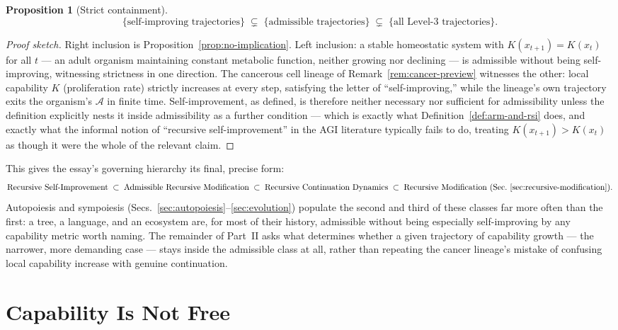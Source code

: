 \documentclass[12pt,a4paper]{article}
\theoremstyle{plain}
\newtheorem{proposition}[theorem]{Proposition}
\theoremstyle{definition}
\theoremstyle{remark}
\newcommand{\Adm}{\mathcal{A}}
\begin{document}
\begin{proposition}[Strict containment]
\label{prop:strict-containment}
\[
\{\text{self-improving trajectories}\} \;\subsetneq\; \{\text{admissible trajectories}\} \;\subsetneq\; \{\text{all Level-3 trajectories}\}.
\]
\end{proposition}

\begin{proof}[Proof sketch]
Right inclusion is Proposition~\ref{prop:no-implication}. Left inclusion: a stable homeostatic system with $K(x_{t+1})=K(x_t)$ for all $t$ — an adult organism maintaining constant metabolic function, neither growing nor declining — is admissible without being self-improving, witnessing strictness in one direction. The cancerous cell lineage of Remark~\ref{rem:cancer-preview} witnesses the other: local capability $K$ (proliferation rate) strictly increases at every step, satisfying the letter of ``self-improving,'' while the lineage's own trajectory exits the organism's $\Adm$ in finite time. Self-improvement, as defined, is therefore neither necessary nor sufficient for admissibility unless the definition explicitly nests it inside admissibility as a further condition — which is exactly what Definition~\ref{def:arm-and-rsi} does, and exactly what the informal notion of ``recursive self-improvement'' in the AGI literature typically fails to do, treating $K(x_{t+1})>K(x_t)$ as though it were the whole of the relevant claim.
\end{proof}

This gives the essay's governing hierarchy its final, precise form:
\[
\text{Recursive Self-Improvement} \;\subset\; \text{Admissible Recursive Modification} \;\subset\; \text{Recursive Continuation Dynamics} \;\subset\; \text{Recursive Modification (Sec.~\ref{sec:recursive-modification})}.
\]
Autopoiesis and sympoiesis (Secs.~\ref{sec:autopoiesis}--\ref{sec:evolution}) populate the second and third of these classes far more often than the first: a tree, a language, and an ecosystem are, for most of their history, admissible without being especially self-improving by any capability metric worth naming. The remainder of Part~II asks what determines whether a given trajectory of capability growth — the narrower, more demanding case — stays inside the admissible class at all, rather than repeating the cancer lineage's mistake of confusing local capability increase with genuine continuation.

\section{Capability Is Not Free}
\label{sec:complexity-repair}
\end{document}
